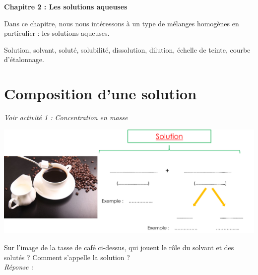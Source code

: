 \renewcommand{\thesubsection}{\textcolor{red}{\Roman{section}.\arabic{subsection}}}
\renewcommand{\thesubsubsection}{\textcolor{red}{\Roman{section}.\arabic{subsection}.\alph{subsubsection}}}

\setcounter{section}{0}
\sndEnTeteCoursDeux

\begin{mdframed}[style=titr, leftmargin=60pt, rightmargin=60pt, innertopmargin=7pt, innerbottommargin=7pt, innerrightmargin=8pt, innerleftmargin=8pt]

\begin{center}
\large{\textbf{Chapitre 2 : Les solutions aqueuses}}
\end{center}
\end{mdframed}
Dans ce chapitre, nous nous intéressons à un type de mélanges homogènes en particulier : les solutions aqueuses. 

\begin{tcolorbox}[colback=blue!5!white,colframe=blue!75!black,title=Mots clés du chapitre :]
Solution, solvant, soluté, solubilité, dissolution, dilution, échelle de teinte, courbe d'étalonnage. 
\end{tcolorbox}


\section{Composition d'une solution}
\begin{Large}
\end{Large}\textit{Voir activité 1 : Concentration en masse}
\begin{tcolorbox}[colback=green!5!white,colframe=green!75!black,title=\textbf{Solution, solvant, soluté}]
\begin{center}
    \includegraphics[width=\textwidth]{Images/Solution_def.png}
\end{center}
\end{tcolorbox}
Sur l'image de la tasse de café ci-dessus, qui jouent le rôle du solvant et des solutés ? Comment s'appelle la solution ?\\
\textit{Réponse :} \\

